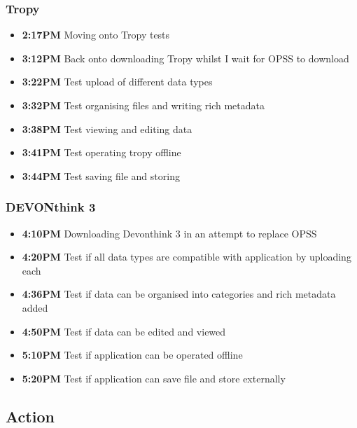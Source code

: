 \documentclass{article}
\begin{document}
\subsubsection{Tropy}
\begin{itemize}
\item \textbf{2:17PM} Moving onto Tropy tests
\item \textbf{3:12PM} Back onto downloading Tropy whilst I wait for OPSS to download
\item \textbf{3:22PM} Test upload of different data types
\item \textbf{3:32PM} Test organising files and writing rich metadata
\item \textbf{3:38PM} Test viewing and editing data 
\item \textbf{3:41PM} Test operating tropy offline
\item \textbf{3:44PM} Test saving file and storing
\end{itemize}

\subsubsection{DEVONthink 3}
\begin{itemize}
\item \textbf{4:10PM} Downloading Devonthink 3 in an attempt to replace OPSS
\item \textbf{4:20PM} Test if all data types are compatible with application by uploading each
\item \textbf{4:36PM} Test if data can be organised into categories and rich metadata added 
\item \textbf{4:50PM} Test if data can be edited and viewed 
\item \textbf{5:10PM} Test if application can be operated offline
\item \textbf{5:20PM} Test if application can save file and store externally 
\end{itemize}

\subsection{Action}
\end{document}
